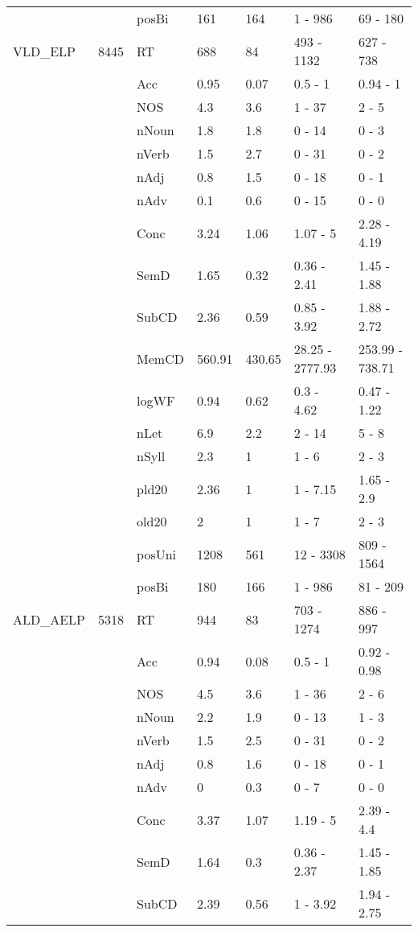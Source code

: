 \begin{table}[ht]
\begin{tabular}{lllllll}
   &  & posBi & 161 & 164 & 1 - 986 & 69 - 180 \\ 
  VLD\_ELP & 8445 & RT & 688 & 84 & 493 - 1132 & 627 - 738 \\ 
   &  & Acc & 0.95 & 0.07 & 0.5 - 1 & 0.94 - 1 \\ 
   &  & NOS & 4.3 & 3.6 & 1 - 37 & 2 - 5 \\ 
   &  & nNoun & 1.8 & 1.8 & 0 - 14 & 0 - 3 \\ 
   &  & nVerb & 1.5 & 2.7 & 0 - 31 & 0 - 2 \\ 
   &  & nAdj & 0.8 & 1.5 & 0 - 18 & 0 - 1 \\ 
   &  & nAdv & 0.1 & 0.6 & 0 - 15 & 0 - 0 \\ 
   &  & Conc & 3.24 & 1.06 & 1.07 - 5 & 2.28 - 4.19 \\ 
   &  & SemD & 1.65 & 0.32 & 0.36 - 2.41 & 1.45 - 1.88 \\ 
   &  & SubCD & 2.36 & 0.59 & 0.85 - 3.92 & 1.88 - 2.72 \\ 
   &  & MemCD & 560.91 & 430.65 & 28.25 - 2777.93 & 253.99 - 738.71 \\ 
   &  & logWF & 0.94 & 0.62 & 0.3 - 4.62 & 0.47 - 1.22 \\ 
   &  & nLet & 6.9 & 2.2 & 2 - 14 & 5 - 8 \\ 
   &  & nSyll & 2.3 & 1 & 1 - 6 & 2 - 3 \\ 
   &  & pld20 & 2.36 & 1 & 1 - 7.15 & 1.65 - 2.9 \\ 
   &  & old20 & 2 & 1 & 1 - 7 & 2 - 3 \\ 
   &  & posUni & 1208 & 561 & 12 - 3308 & 809 - 1564 \\ 
   &  & posBi & 180 & 166 & 1 - 986 & 81 - 209 \\ 
  ALD\_AELP & 5318 & RT & 944 & 83 & 703 - 1274 & 886 - 997 \\ 
   &  & Acc & 0.94 & 0.08 & 0.5 - 1 & 0.92 - 0.98 \\ 
   &  & NOS & 4.5 & 3.6 & 1 - 36 & 2 - 6 \\ 
   &  & nNoun & 2.2 & 1.9 & 0 - 13 & 1 - 3 \\ 
   &  & nVerb & 1.5 & 2.5 & 0 - 31 & 0 - 2 \\ 
   &  & nAdj & 0.8 & 1.6 & 0 - 18 & 0 - 1 \\ 
   &  & nAdv & 0 & 0.3 & 0 - 7 & 0 - 0 \\ 
   &  & Conc & 3.37 & 1.07 & 1.19 - 5 & 2.39 - 4.4 \\ 
   &  & SemD & 1.64 & 0.3 & 0.36 - 2.37 & 1.45 - 1.85 \\ 
   &  & SubCD & 2.39 & 0.56 & 1 - 3.92 & 1.94 - 2.75 \\ 

\end{tabular}
\end{table}
